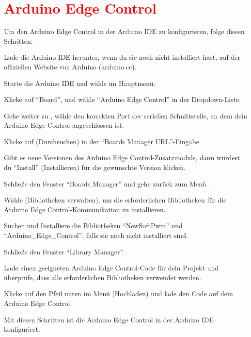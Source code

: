 %
%
%




\chapter{\textcolor{red}{Arduino Edge Control}}


Um den Arduino Edge Control in der Arduino IDE zu konfigurieren, folge diesen Schritten:

Lade die Arduino IDE herunter, wenn du sie noch nicht installiert hast, auf der offiziellen Website von Arduino (arduino.cc).

Starte die Arduino IDE und wähle  im Hauptmenü.

Klicke auf ``Board'', und wähle ``Arduino Edge Control'' in der Dropdown-Liste.

Gehe weiter zu , wähle den korrekten Port der seriellen Schnittstelle, an dem dein Arduino Edge Control angeschlossen ist.

Klicke auf  (Durchsuchen) in der ``Boards Manager URL''-Eingabe.

Gibt es neue Versionen des Arduino Edge Control-Zusatzmoduls, dann würdest du ``Install'' (Installieren) für die gewünschte Version klicken.

Schließe den Fenster ``Boards Manager'' und gehe zurück zum Menü .

Wähle  (Bibliotheken verwalten), um die erforderlichen Bibliotheken für die Arduino Edge Control-Kommunikation zu installieren.

Suchen und Installiere die Bibliotheken ``NewSoftPwm'' und ``Arduino\_Edge\_Control'', falls sie noch nicht installiert sind.

Schließe den Fenster ``Library Manager''.

Lade einen geeigneten Arduino Edge Control-Code für dein Projekt und überprüfe, dass alle erforderlichen Bibliotheken verwendet werden.

Klicke auf den Pfeil unten im Menü  (Hochladen) und lade den Code auf dein Arduino Edge Control.

Mit diesen Schritten ist die Arduino Edge Control in der Arduino IDE konfiguriert.




